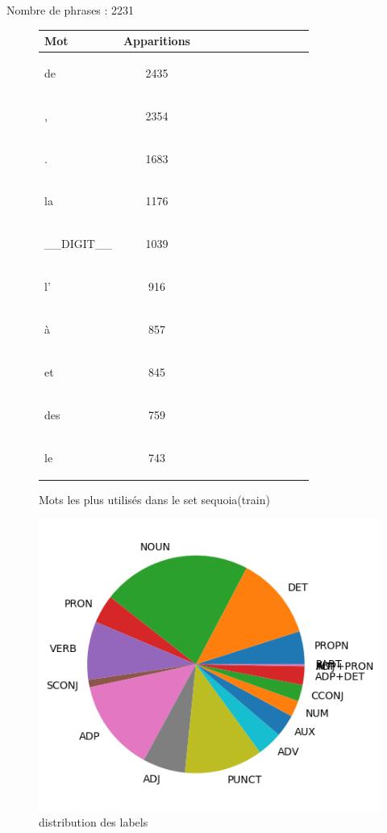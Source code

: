  Nombre de phrases : 2231\\ 
\begin{figure}[H] \begin{minipage}{0.48\textwidth} \centering \begin{tabular}{|l || *{11 }{|c} |} \hline
Mot & Apparitions  \\ \hline
\begin{verb} de \end{verb} &2435\\ \hline
\begin{verb} , \end{verb} &2354\\ \hline
\begin{verb} . \end{verb} &1683\\ \hline
\begin{verb} la \end{verb} &1176\\ \hline
\begin{verb} __DIGIT__ \end{verb} &1039\\ \hline
\begin{verb} l' \end{verb} &916\\ \hline
\begin{verb} à \end{verb} &857\\ \hline
\begin{verb} et \end{verb} &845\\ \hline
\begin{verb} des \end{verb} &759\\ \hline
\begin{verb} le \end{verb} &743\\ \hline

\end{tabular}
\caption{ Mots les plus utilisés dans le set sequoia(train) } \label{Fig:muw}\end{minipage} 
\begin{minipage}{0.48\textwidth} \centering
\includegraphics[width=.7\linewidth]{sequoiatrain_img.png}
\caption{distribution des labels}
\end{minipage}
\end{figure}


